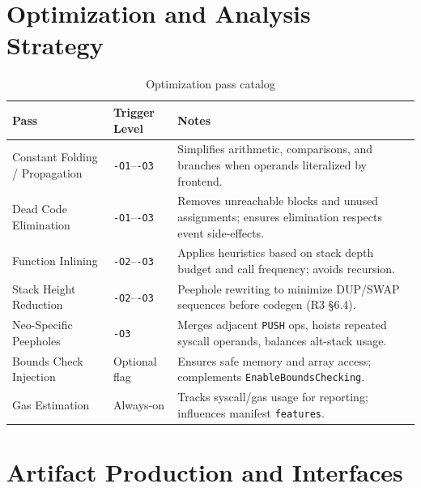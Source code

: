 \documentclass[11pt]{article}
\begin{document}
\section{Optimization and Analysis Strategy}
\begin{table}[H]
\centering
\caption{Optimization pass catalog}
\begin{tabularx}{\textwidth}{@{}p{}p{}X@{}}
\toprule
Pass & Trigger Level & Notes \\
\midrule
Constant Folding / Propagation & \texttt{-O1}--\texttt{-O3} & Simplifies arithmetic, comparisons, and branches when operands literalized by frontend.\\
Dead Code Elimination & \texttt{-O1}--\texttt{-O3} & Removes unreachable blocks and unused assignments; ensures elimination respects event side-effects.\\
Function Inlining & \texttt{-O2}--\texttt{-O3} & Applies heuristics based on stack depth budget and call frequency; avoids recursion.\\
Stack Height Reduction & \texttt{-O2}--\texttt{-O3} & Peephole rewriting to minimize DUP/SWAP sequences before codegen (R3 \S6.4).\\
Neo-Specific Peepholes & \texttt{-O3} & Merges adjacent \texttt{PUSH} ops, hoists repeated syscall operands, balances alt-stack usage.\\
Bounds Check Injection & Optional flag & Ensures safe memory and array access; complements \texttt{EnableBoundsChecking}.\\
Gas Estimation & Always-on & Tracks syscall/gas usage for reporting; influences manifest \texttt{features}.\\
\bottomrule
\end{tabularx}
\end{table}

\section{Artifact Production and Interfaces}
\end{document}
